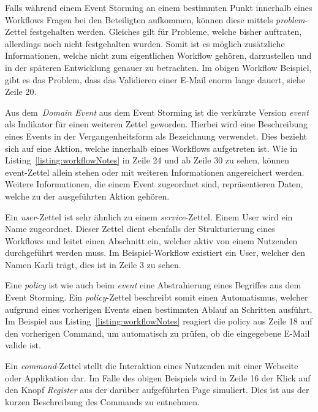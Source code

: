 
Falls während einem Event Storming an einem bestimmten Punkt innerhalb eines Workflows Fragen bei den Beteiligten aufkommen,
können diese mittels \textit{problem}-Zettel festgehalten werden.
Gleiches gilt für Probleme, welche bisher auftraten, allerdings noch nicht festgehalten wurden.
Somit ist es möglich zusätzliche Informationen, welche nicht zum eigentlichen Workflow gehören, darzustellen und in der
späteren Entwicklung genauer zu betrachten.
Im obigen Workflow Beispiel, gibt es das Problem, dass das Validieren einer E-Mail enorm lange dauert, siehe Zeile 20.


Aus dem~\textit{Domain Event} aus dem Event Storming ist die verkürzte Version \textit{event} als Indikator für einen weiteren Zettel geworden.
Hierbei wird eine Beschreibung eines Events in der Vergangenheitsform als Bezeichnung verwendet.
Dies bezieht sich auf eine Aktion, welche innerhalb eines Workflows aufgetreten ist.
Wie in Listing~\ref{listing:workflowNotes} in Zeile 24 und ab Zeile 30 zu sehen, können event-Zettel allein stehen oder mit weiteren Informationen
angereichert werden.
Weitere Informationen, die einem Event zugeordnet sind, repräsentieren Daten, welche zu der ausgeführten Aktion gehören.


Ein \textit{user}-Zettel ist sehr ähnlich zu einem \textit{service}-Zettel.
Einem User wird ein Name zugeordnet.
Dieser Zettel dient ebenfalls der Strukturierung eines Workflows und leitet einen Abschnitt ein, welcher aktiv von einem
Nutzenden durchgeführt werden muss.
Im Beispiel-Workflow existiert ein User, welcher den Namen Karli trägt, dies ist in Zeile 3 zu sehen.


Eine \textit{policy} ist wie auch beim \textit{event} eine Abstrahierung eines Begriffes aus dem Event Storming.
Ein \textit{policy}-Zettel beschreibt somit einen Automatismus, welcher aufgrund eines vorherigen Events einen bestimmten
Ablauf an Schritten ausführt.
Im Beispiel aus Listing~\ref{listing:workflowNotes} reagiert die policy aus Zeile 18 auf den vorherigen Command, um automatisch zu prüfen,
ob die eingegebene E-Mail valide ist.


Ein \textit{command}-Zettel stellt die Interaktion eines Nutzenden mit einer Webseite oder Applikation dar.
Im Falle des obigen Beispiels wird in Zeile 16 der Klick auf den Knopf \textit{Register} aus der darüber aufgeführten Page simuliert.
Dies ist aus der kurzen Beschreibung des Commands zu entnehmen.

